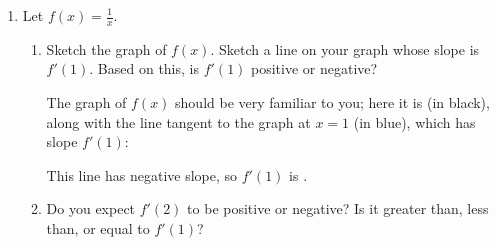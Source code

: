 \documentclass{article}
\begin{document}
\begin{enumerate}[resume]

\item  \label{1/x-derivative}
  Let $\displaystyle f(x) = \frac{1}{x}$.
  \begin{enumerate}

  \item \label{1/x-derivative-graph}
    \begin{problem}[\stretch{3}]
      Sketch the graph of $f(x)$.  Sketch a line on your graph whose slope
      is $f'(1)$.  Based on this, is $f'(1)$ positive or negative?
    \end{problem}

    \begin{solution}
      The graph of $f(x)$ should be very familiar to you; here it is (in
      black), along with the line tangent to the graph at $x = 1$ (in
      blue), which has slope $f'(1)$:
      \begin{center}
      \end{center}
      This line has negative slope, so $f'(1)$ is . 
    \end{solution}

  \item


    \begin{problem}[\vfill]
      Do you expect $f'(2)$ to be positive or negative? Is it greater than, less than, or equal to $f'(1)$?
    \end{problem}


\end{enumerate}
\end{enumerate}
\end{document}
